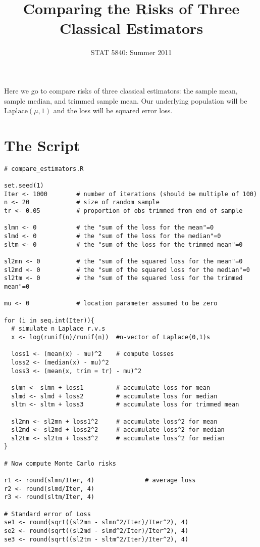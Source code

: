 \documentclass[11pt,english]{article}
\title{Comparing the Risks of Three Classical Estimators}
\date{STAT 5840: Summer 2011}
\begin{document}
\maketitle

\thispagestyle{empty}

Here we go to compare risks of three classical estimators: the sample mean, sample median, and trimmed sample mean.  Our underlying population will be $\mathrm{Laplace}(\mu,1)$ and the loss will be squared error loss.

\section*{The Script}
\label{sec-1}


\begin{verbatim}
# compare_estimators.R

set.seed(1)
Iter <- 1000        # number of iterations (should be multiple of 100)
n <- 20             # size of random sample
tr <- 0.05          # proportion of obs trimmed from end of sample

slmn <- 0           # the "sum of the loss for the mean"=0
slmd <- 0           # the "sum of the loss for the median"=0
sltm <- 0           # the "sum of the loss for the trimmed mean"=0

sl2mn <- 0          # the "sum of the squared loss for the mean"=0
sl2md <- 0          # the "sum of the squared loss for the median"=0
sl2tm <- 0          # the "sum of the squared loss for the trimmed mean"=0

mu <- 0             # location parameter assumed to be zero

for (i in seq.int(Iter)){
  # simulate n Laplace r.v.s
  x <- log(runif(n)/runif(n))  #n-vector of Laplace(0,1)s
                             
  loss1 <- (mean(x) - mu)^2    # compute losses
  loss2 <- (median(x) - mu)^2
  loss3 <- (mean(x, trim = tr) - mu)^2

  slmn <- slmn + loss1         # accumulate loss for mean
  slmd <- slmd + loss2         # accumulate loss for median
  sltm <- sltm + loss3         # accumulate loss for trimmed mean

  sl2mn <- sl2mn + loss1^2     # accumulate loss^2 for mean
  sl2md <- sl2md + loss2^2     # accumulate loss^2 for median
  sl2tm <- sl2tm + loss3^2     # accumulate loss^2 for median
}

# Now compute Monte Carlo risks

r1 <- round(slmn/Iter, 4)              # average loss
r2 <- round(slmd/Iter, 4)
r3 <- round(sltm/Iter, 4)

# Standard error of Loss
se1 <- round(sqrt((sl2mn - slmn^2/Iter)/Iter^2), 4)
se2 <- round(sqrt((sl2md - slmd^2/Iter)/Iter^2), 4)
se3 <- round(sqrt((sl2tm - sltm^2/Iter)/Iter^2), 4)
\end{verbatim}
\end{document}
